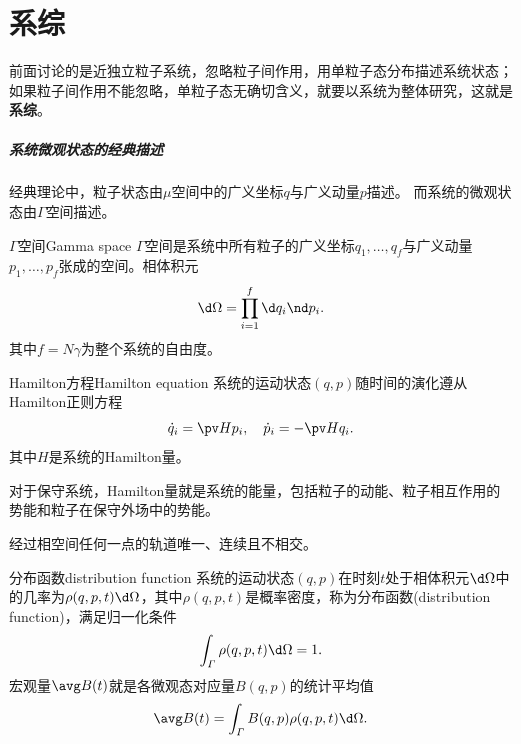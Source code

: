 \newcommand*{\Cr}{\mathrm C}
\newcommand*{\rs}{\mathrm r}
\newcommand*{\st}{\mathrm s}

\chapter{系综}

前面讨论的是近独立粒子系统，忽略粒子间作用，用单粒子态分布描述系统状态；如果粒子间作用不能忽略，单粒子态无确切含义，就要以系统为整体研究，这就是\textbf{系综}。

\paragraph{系统微观状态的经典描述}

经典理论中，粒子状态由$\mu$空间中的广义坐标$q$与广义动量$p$描述。
而系统的微观状态由$\varGamma$空间描述。

\begin{definition}{$\varGamma$空间}{Gamma space}
	$\varGamma$空间是系统中所有粒子的广义坐标$q_1,\ldots,q_f$与广义动量$p_1,\ldots,p_f$张成的空间。相体积元
	\begin{equation}
		\d\Omega=\prod_{i=1}^f\d q_i\nd p_i.
	\end{equation}
	其中$f=N\gamma$为整个系统的自由度。
\end{definition}

\begin{theorem}
	{Hamilton方程}{Hamilton equation}
	系统的运动状态$(q,p)$随时间的演化遵从Hamilton正则方程
	\begin{equation}
		\dot q_i=\pv H{p_i},\quad \dot p_i=-\pv H{q_i}.
	\end{equation}
	其中$H$是系统的Hamilton量。
\end{theorem}

\begin{remark}
	对于保守系统，Hamilton量就是系统的能量，包括粒子的动能、粒子相互作用的势能和粒子在保守外场中的势能。
\end{remark}

\begin{corollary}
	经过相空间任何一点的轨道唯一、连续且不相交。
\end{corollary}

\begin{definition}
	{分布函数}{distribution function}
	系统的运动状态$(q,p)$在时刻$t$处于相体积元$\d\Omega$中的几率为$\rho(q,p,t)\d\Omega$，其中$\rho(q,p,t)$是概率密度，称为分布函数(distribution function)，满足归一化条件
	\[
		\int_\varGamma\rho(q,p,t)\d\Omega=1.
	\]
	宏观量$\avg B(t)$就是各微观态对应量$B(q,p)$的统计平均值
	\begin{equation}
		\avg B(t)=\int_\varGamma B(q,p)\rho(q,p,t)\d\Omega.
	\end{equation}
\end{definition}

